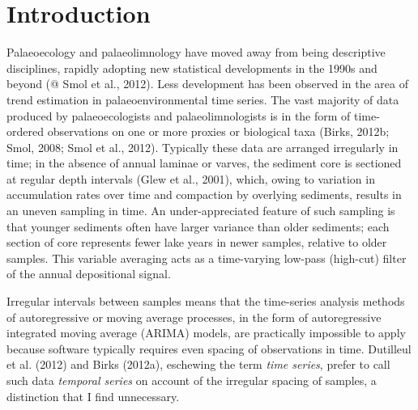 \documentclass[12pt,]{article}
\begin{document}
\section{Introduction}\label{introduction}

Palaeoecology and palaeolimnology have moved away from being descriptive
disciplines, rapidly adopting new statistical developments in the 1990s
and beyond (@ Smol et al., 2012). Less development has been observed in
the area of trend estimation in palaeoenvironmental time series. The
vast majority of data produced by palaeoecologists and
palaeolimnologists is in the form of time-ordered observations on one or
more proxies or biological taxa (Birks, 2012b; Smol, 2008; Smol et al.,
2012). Typically these data are arranged irregularly in time; in the
absence of annual laminae or varves, the sediment core is sectioned at
regular depth intervals (Glew et al., 2001), which, owing to variation
in accumulation rates over time and compaction by overlying sediments,
results in an uneven sampling in time. An under-appreciated feature of
such sampling is that younger sediments often have larger variance than
older sediments; each section of core represents fewer lake years in
newer samples, relative to older samples. This variable averaging acts
as a time-varying low-pass (high-cut) filter of the annual depositional
signal.

Irregular intervals between samples means that the time-series analysis
methods of autoregressive or moving average processes, in the form of
autoregressive integrated moving average (ARIMA) models, are practically
impossible to apply because software typically requires even spacing of
observations in time. Dutilleul et al. (2012) and Birks (2012a),
eschewing the term \emph{time series}, prefer to call such data
\emph{temporal series} on account of the irregular spacing of samples, a
distinction that I find unnecessary.
\end{document}
